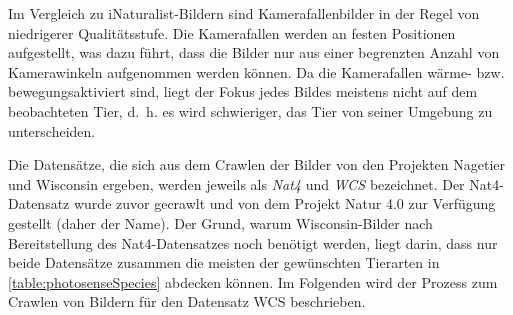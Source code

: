Im Vergleich zu iNaturalist-Bildern sind Kamerafallenbilder in der Regel von niedrigerer Qualitätsstufe. Die Kamerafallen werden an festen Positionen aufgestellt, was dazu führt, dass die Bilder nur aus einer begrenzten Anzahl von Kamerawinkeln aufgenommen werden können. Da die Kamerafallen wärme- bzw. bewegungsaktiviert sind, liegt der Fokus jedes Bildes meistens nicht auf dem beobachteten Tier, d.~h. es wird schwieriger, das Tier von seiner Umgebung zu unterscheiden.

Die Datensätze, die sich aus dem Crawlen der Bilder von den Projekten Nagetier und Wisconsin ergeben, werden jeweils als \emph{Nat4} und \emph{WCS} bezeichnet. Der Nat4-Datensatz wurde zuvor gecrawlt und von dem Projekt Natur 4.0 zur Verfügung gestellt (daher der Name). Der Grund, warum Wisconsin-Bilder nach Bereitstellung des Nat4-Datensatzes noch benötigt werden, liegt darin, dass nur beide Datensätze zusammen die meisten der gewünschten Tierarten in \autoref{table:photosenseSpecies} abdecken können. Im Folgenden wird der Prozess zum Crawlen von Bildern für den Datensatz WCS beschrieben.

